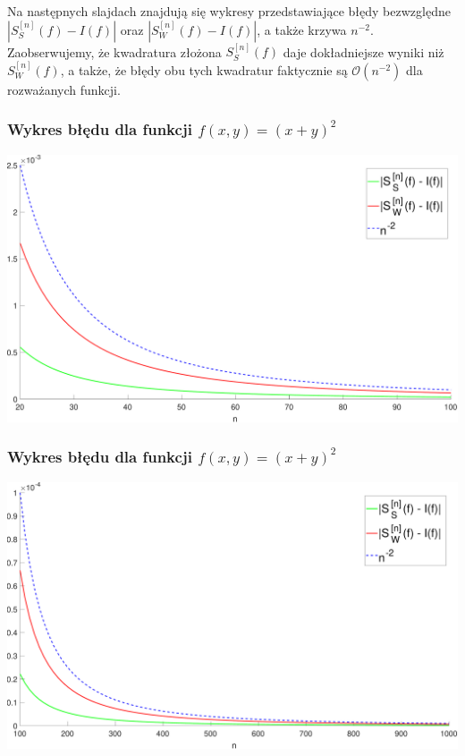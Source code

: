 \documentclass[9pt]{beamer}
\begin{document}
\begin{frame}
\begin{table}[]
{\begin{tabular}{|l|S|l|S|S|}
				
				\hline
			\end{tabular}
		}
	\end{table}  
\end{frame}

\begin{frame}
	\begin{spacing}{1.5}
		Na następnych slajdach znajdują się wykresy przedstawiające błędy bezwzględne $ | S_S^{[n]}(f) - I(f) | $ oraz $ | S_W^{[n]}(f) - I(f) | $, a także krzywa $ n^{-2} $.\\
		\vspace{1cm}
		Zaobserwujemy, że kwadratura złożona $ S_S^{[n]}(f) $ daje dokładniejsze wyniki niż $ S_W^{[n]}(f) $, a także, że błędy obu tych kwadratur faktycznie są $ \mathcal{O}(n^{-2}) $ dla rozważanych funkcji.
	\end{spacing}
\end{frame}

\begin{frame}
    \frametitle{Wykres błędu dla funkcji $f(x,y) = (x+y)^2$}
    \includegraphics[width = \linewidth]{(x+y)2-20-100-1.pdf}
\end{frame}

\begin{frame}
	\frametitle{Wykres błędu dla funkcji $f(x,y) = (x+y)^2$}
	\includegraphics[width = \linewidth]{(x+y)2-100-1000-10.pdf}
\end{frame}
\end{document}
